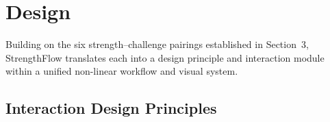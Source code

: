 \documentclass[manuscript,screen,review,anonymous]{acmart}
\begin{document}



\section{Design}
Building on the six strength--challenge pairings established in Section~3, StrengthFlow translates each into a design principle and interaction module within a unified non-linear workflow and visual system.
\subsection{Interaction Design Principles}
\end{document}
